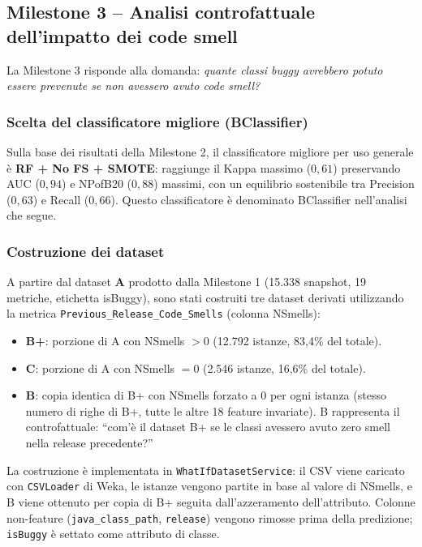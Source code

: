 \subsection{Milestone 3 -- Analisi controfattuale dell'impatto dei code smell}

La Milestone 3 risponde alla domanda: \textit{quante classi buggy avrebbero potuto essere
prevenute se non avessero avuto code smell?}

\subsubsection{Scelta del classificatore migliore (BClassifier)}

Sulla base dei risultati della Milestone 2, il classificatore migliore per uso generale è
\textbf{RF + No FS + SMOTE}: raggiunge il Kappa massimo ($0{,}61$) preservando AUC ($0{,}94$)
e NPofB20 ($0{,}88$) massimi, con un equilibrio sostenibile tra Precision ($0{,}63$) e
Recall ($0{,}66$). Questo classificatore è denominato BClassifier nell'analisi che segue.

\subsubsection{Costruzione dei dataset}

A partire dal dataset \textbf{A} prodotto dalla Milestone 1
(15.338 snapshot, 19 metriche, etichetta isBuggy), sono stati costruiti tre dataset
derivati utilizzando la metrica \texttt{Previous\_Release\_Code\_Smells} (colonna NSmells):

\begin{itemize}
  \item \textbf{B+}: porzione di A con NSmells $> 0$ (12.792 istanze, 83,4\% del totale).
  \item \textbf{C}: porzione di A con NSmells $= 0$ (2.546 istanze, 16,6\% del totale).
  \item \textbf{B}: copia identica di B+ con NSmells forzato a $0$ per ogni istanza
        (stesso numero di righe di B+, tutte le altre 18 feature invariate). B rappresenta
        il controfattuale: ``com'è il dataset B+ se le classi avessero avuto zero smell
        nella release precedente?''
\end{itemize}

La costruzione è implementata in \texttt{WhatIfDatasetService}: il CSV viene caricato con
\texttt{CSVLoader} di Weka, le istanze vengono partite in base al valore di NSmells, e B
viene ottenuto per copia di B+ seguita dall'azzeramento dell'attributo. Colonne non-feature
(\texttt{java\_class\_path}, \texttt{release}) vengono rimosse prima della predizione;
\texttt{isBuggy} è settato come attributo di classe.

